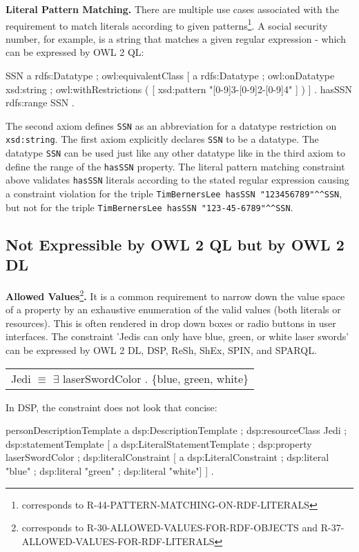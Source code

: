 \documentclass{llncs}
\newcommand{\ms}[1]{\texttt{#1}}
\newenvironment{DL}{
  \scriptsize
  \sffamily
  \vspace{0.3cm}
  \begin{tabular}{l}

}{
  \end{tabular}
  \linebreak
}
\begin{document}
\textbf{Literal Pattern Matching.}
There are multiple use cases associated with the requirement to match literals according to given patterns\footnote{corresponds to R-44-PATTERN-MATCHING-ON-RDF-LITERALS}.
A social security number, for example, is a string that matches a given regular expression - which can be expressed by OWL 2 QL: 

\begin{ex}
SSN 
    a rdfs:Datatype ;
    owl:equivalentClass [
        a rdfs:Datatype ;
        owl:onDatatype xsd:string ;
        owl:withRestrictions ( 
            [ xsd:pattern "[0-9]{3}-[0-9]{2}-[0-9]{4}" ] ) ] .
hasSSN rdfs:range SSN .
\end{ex}

The second axiom defines \ms{SSN} as an abbreviation for a datatype restriction on \ms{xsd:string}. 
The first axiom explicitly declares \ms{SSN} to be a datatype. 
The datatype \ms{SSN} can be used just like any other datatype like in the third axiom to define the range of the \ms{hasSSN} property.
The literal pattern matching constraint above validates \ms{hasSSN} literals according to the stated regular expression causing a constraint violation for the triple 
\ms{TimBernersLee hasSSN "123456789"\textasciicircum{}\textasciicircum{}SSN}, 
but not for the triple \ms{TimBernersLee hasSSN "123-45-6789"\textasciicircum{}\textasciicircum{}SSN}.

\subsection{Not Expressible by OWL 2 QL but by OWL 2 DL}

\textbf{Allowed Values}\footnote{corresponds to R-30-ALLOWED-VALUES-FOR-RDF-OBJECTS and R-37-ALLOWED-VALUES-FOR-RDF-LITERALS}\textbf{.}
It is a common requirement to narrow down the value space of a property by an exhaustive enumeration of the valid values (both literals or resources). This is often rendered in drop down boxes or radio buttons in user interfaces. 
The constraint 'Jedis can only have blue, green, or white laser swords' can be expressed by OWL 2 DL, DSP, ReSh, ShEx, SPIN, and SPARQL.

\begin{DL}
Jedi $\equiv$ $\exists$ laserSwordColor . \{blue, green, white\} \\
\end{DL}

In DSP, the constraint does not look that concise:

\begin{ex}
personDescriptionTemplate
    a dsp:DescriptionTemplate ;
    dsp:resourceClass Jedi ;
    dsp:statementTemplate [
        a dsp:LiteralStatementTemplate ;
        dsp:property laserSwordColor ;
        dsp:literalConstraint [
            a dsp:LiteralConstraint ;
            dsp:literal "blue" ;
            dsp:literal "green" ;
            dsp:literal "white"] ] .
\end{ex}
\end{document}
